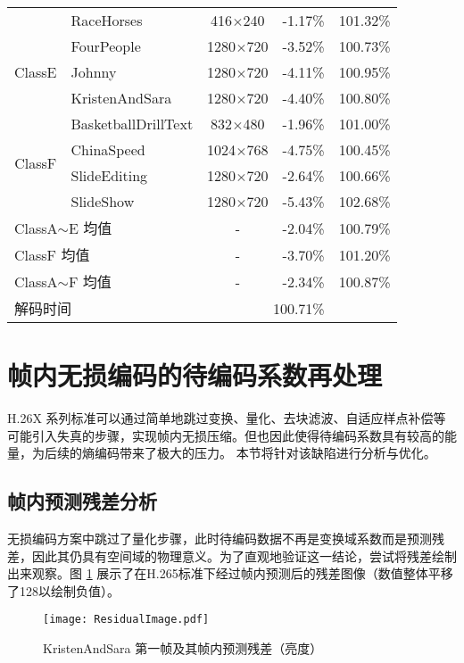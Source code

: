 \begin{table}[!p]
\begin{tabular}{clccc}
                                               & RaceHorses                   & 416$\times$240   & -1.17\%  & 101.32\% \\
        \multirow{3}{*}{ClassE}                & FourPeople                   & 1280$\times$720  & -3.52\%  & 100.73\% \\
                                               & Johnny                       & 1280$\times$720  & -4.11\%  & 100.95\% \\
                                               & KristenAndSara               & 1280$\times$720  & -4.40\%  & 100.80\% \\
        \multirow{4}{*}{ClassF}                & BasketballDrillText          & 832$\times$480   & -1.96\%  & 101.00\% \\
                                               & ChinaSpeed                   & 1024$\times$768  & -4.75\%  & 100.45\% \\
                                               & SlideEditing                 & 1280$\times$720  & -2.64\%  & 100.66\% \\
                                               & SlideShow                    & 1280$\times$720  & -5.43\%  & 102.68\% \\ \midrule
        \multicolumn{2}{l}{ClassA$\sim$E 均值} & -                            & -2.04\%          & 100.79\%            \\ \midrule
        \multicolumn{2}{l}{ClassF 均值}        & -                            & -3.70\%          & 101.20\%            \\ \midrule
        \multicolumn{2}{l}{ClassA$\sim$F 均值} & -                            & -2.34\%          & 100.87\%            \\ \midrule
        \multicolumn{2}{l}{解码时间}           & \multicolumn{3}{c}{100.71\%}                                          \\ \bottomrule
    \end{tabular}
\end{table}

\section{帧内无损编码的待编码系数再处理}
H.26X 系列标准可以通过简单地跳过变换、量化、去块滤波、自适应样点补偿等可能引入失真的步骤，实现帧内无损压缩。但也因此使得待编码系数具有较高的能量，为后续的熵编码带来了极大的压力。
本节将针对该缺陷进行分析与优化。

\subsection{帧内预测残差分析}
无损编码方案中跳过了量化步骤，此时待编码数据不再是变换域系数而是预测残差，因此其仍具有空间域的物理意义。为了直观地验证这一结论，尝试将残差绘制出来观察。图 \ref{fig:ResidualImage} 展示了在H.265标准下经过帧内预测后的残差图像（数值整体平移了128以绘制负值）。
\begin{figure}[hbt]
    \centering
    \texttt{[image: ResidualImage.pdf]}
    \caption{KristenAndSara 第一帧及其帧内预测残差（亮度）}
    \label{fig:ResidualImage}
\end{figure}

